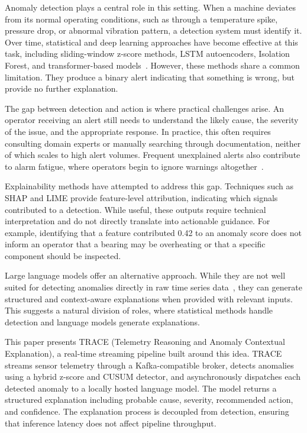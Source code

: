 \documentclass[11pt, a4paper]{article}
\begin{document}
Anomaly detection plays a central role in this setting. When a machine 
deviates from its normal operating conditions, such as through a 
temperature spike, pressure drop, or abnormal vibration pattern, a 
detection system must identify it. Over time, statistical and deep 
learning approaches have become effective at this task, including 
sliding-window z-score methods, LSTM autoencoders, Isolation Forest, 
and transformer-based models~\cite{chandola2009anomaly}. However, these 
methods share a common limitation. They produce a binary alert indicating 
that something is wrong, but provide no further explanation.

The gap between detection and action is where practical challenges arise. 
An operator receiving an alert still needs to understand the likely cause, 
the severity of the issue, and the appropriate response. In practice, this 
often requires consulting domain experts or manually searching through 
documentation, neither of which scales to high alert volumes. Frequent 
unexplained alerts also contribute to alarm fatigue, where operators begin 
to ignore warnings altogether~\cite{hollifield2011alarm}.

Explainability methods have attempted to address this gap. Techniques such 
as SHAP and LIME provide feature-level attribution, indicating which 
signals contributed to a detection. While useful, these outputs require 
technical interpretation and do not directly translate into actionable 
guidance. For example, identifying that a feature contributed 0.42 to an 
anomaly score does not inform an operator that a bearing may be overheating 
or that a specific component should be inspected.

Large language models offer an alternative approach. While they are not 
well suited for detecting anomalies directly in raw time series 
data~\cite{openreview2024llmts}, they can generate structured and 
context-aware explanations when provided with relevant inputs. This 
suggests a natural division of roles, where statistical methods handle 
detection and language models generate explanations.

This paper presents TRACE (Telemetry Reasoning and Anomaly Contextual 
Explanation), a real-time streaming pipeline built around this idea. TRACE 
streams sensor telemetry through a Kafka-compatible broker, detects 
anomalies using a hybrid z-score and CUSUM detector, and asynchronously 
dispatches each detected anomaly to a locally hosted language model. The 
model returns a structured explanation including probable cause, severity, 
recommended action, and confidence. The explanation process is decoupled 
from detection, ensuring that inference latency does not affect pipeline 
throughput.
\end{document}
